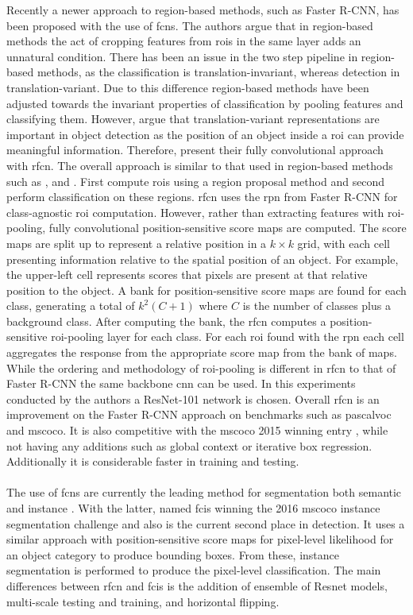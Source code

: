 Recently a newer approach to region-based methods, such as Faster R-CNN, has been proposed with the use of \glspl{fcn}. The authors argue that in region-based methods the act of cropping features from \glspl{roi} in the same layer adds an unnatural condition. There has been an issue in the two step pipeline in region-based methods, as the classification is translation-invariant, whereas detection in translation-variant. Due to this difference region-based methods have been adjusted towards the invariant properties of classification by pooling features and classifying them. However, \cite{rfcn} argue that translation-variant representations are important in object detection as the position of an object inside a \gls{roi} can provide meaningful information. Therefore, \cite{rfcn} present their fully convolutional approach with \gls{rfcn}. The overall approach is similar to that used in region-based methods such as \cite{rcnn}, \cite{fastrcnn} and \cite{fasterrcnn}. First compute \glspl{roi} using a region proposal method and second perform classification on these regions. \gls{rfcn} uses the \gls{rpn} from Faster R-CNN \cite{fasterrcnn} for class-agnostic \gls{roi} computation. However, rather than extracting features with \gls{roi}-pooling, fully convolutional position-sensitive score maps are computed. The score maps are split up to represent a relative position in a $k\times k$ grid, with each cell presenting information relative to the spatial position of an object. For example, the upper-left cell represents scores that pixels are present at that relative position to the object. A bank for position-sensitive score maps are found for each class, generating a total of $k^2(C+1)$ where $C$ is the number of classes plus a background class. After computing the bank, the \gls{rfcn} computes a position-sensitive \gls{roi}-pooling layer for each class. For each \gls{roi} found with the \gls{rpn} each cell aggregates the response from the appropriate score map from the bank of maps. While the ordering and methodology of \gls{roi}-pooling is different in \gls{rfcn} to that of Faster R-CNN the same backbone \gls{cnn} can be used. In this experiments conducted by the authors a ResNet-101 network is chosen. Overall \gls{rfcn} is an improvement on the Faster R-CNN approach on benchmarks such as \gls{pascalvoc} and \gls{mscoco}. It is also competitive with the \gls{mscoco} 2015 winning entry \cite{deepres}, while not having any additions such as global context or iterative box regression. Additionally it is considerable faster in training and testing. 
\\\\
The use of \glspl{fcn} are currently the leading method for segmentation both semantic \cite{semfcn} and instance \cite{instancefcn}. With the latter, named \gls{fcis} winning the 2016 \gls{mscoco} instance segmentation challenge and also is the current second place in detection. It uses a similar approach with position-sensitive score maps for pixel-level likelihood for an object category to produce bounding boxes. From these, instance segmentation is performed to produce the pixel-level classification. The main differences between \gls{rfcn} and \gls{fcis} is the addition of ensemble of Resnet models, multi-scale testing and training, and horizontal flipping.